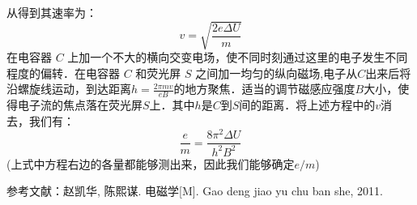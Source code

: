 从得到其速率为：
\begin{equation}
v=\sqrt{\frac{2e\Delta U}{m}}
\end{equation}
在电容器 $C$ 上加一个不大的横向交变电场，使不同时刻通过这里的电子发生不同程度的偏转．在电容器 $C$ 和荧光屏 $S$ 之间加一均匀的纵向磁场,电子从$C$出来后将沿螺旋线运动，到达距离$h=\frac{2\pi mv}{eB}$的地方聚焦．适当的调节磁感应强度$B$大小，使得电子流的焦点落在荧光屏$S$上．其中$h$是$C$到$S$间的距离．将上述方程中的$v$消去，我们有：
\begin{equation}
\frac {e}{m}=\frac{8\pi ^2 \Delta U}{h^2 B^2}
\end{equation}
(上式中方程右边的各量都能够测出来，因此我们能够确定$e/m$)


参考文献：赵凯华, 陈熙谋. 电磁学[M]. Gao deng jiao yu chu ban she, 2011.
